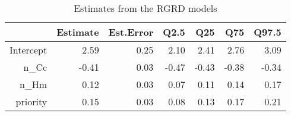 \documentclass{article}\usepackage[]{graphicx}\usepackage[]{color}
\begin{document}
\begin{table}[ht]
\centering
\begin{tabular}{rrrrrrr}
  \hline
 & Estimate & Est.Error & Q2.5 & Q25 & Q75 & Q97.5 \\ 
  \hline
Intercept & 2.59 & 0.25 & 2.10 & 2.41 & 2.76 & 3.09 \\ 
  n\_Cc & -0.41 & 0.03 & -0.47 & -0.43 & -0.38 & -0.34 \\ 
  n\_Hm & 0.12 & 0.03 & 0.07 & 0.11 & 0.14 & 0.17 \\ 
  priority & 0.15 & 0.03 & 0.08 & 0.13 & 0.17 & 0.21 \\ 
   \hline
\end{tabular}
\caption{Estimates from the RGRD models}
\end{table}
\end{document}
